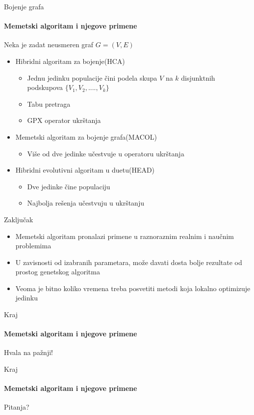 \documentclass{beamer}
\begin{document}
\begin{frame}[fragile]{Bojenje grafa}
  \framesubtitle{Memetski algoritam i njegove primene}

Neka je zadat neusmeren graf $G = (V, E)$

   \begin{itemize}
    \item{Hibridni algoritam za bojenje(HCA)}
        \begin{itemize}
            \item Jednu jedinku populacije čini podela skupa $V$ na $k$  disjunktnih podskupova $\{V_1, V_2, ...., V_k\}$
            \item Tabu pretraga
            \item GPX operator ukrštanja \cite{galinier1999hybrid}
        \end{itemize}
    \item{Memetski algoritam za bojenje grafa(MACOL)}
        \begin{itemize}
            \item Više od dve jedinke učestvuje u operatoru ukrštanja
        \end{itemize}
    \item{Hibridni evolutivni algoritam u duetu(HEAD)}
        \begin{itemize}
            \item Dve jedinke čine populaciju
            \item Najbolja rešenja učestvuju u ukrštanju
        \end{itemize}
  \end{itemize}
  

\end{frame}




\begin{frame}[fragile]{Zaključak}
  
   \begin{itemize}
    \item{Memetski algoritam pronalazi primene u raznoraznim realnim i naučnim problemima}
    \item{U zavisnosti od izabranih parametara, može davati dosta bolje rezultate od prostog genetskog algoritma}
    \item{Veoma je bitno koliko vremena treba posvetiti metodi koja lokalno optimizuje jedinku}
    
    \end{itemize}
\end{frame}


\begin{frame}{Kraj}
  \framesubtitle{Memetski algoritam i njegove primene}

  
\centering
\Huge{Hvala na pažnji!}

\end{frame}




\begin{frame}{Kraj}
  \framesubtitle{Memetski algoritam i njegove primene}
\centering
\Huge{Pitanja?}

\end{frame}

 

\end{document}
